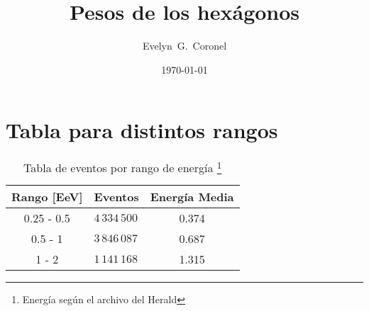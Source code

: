 



\title{Pesos de los hexágonos}
\author{Evelyn~G.~Coronel}


\date[]{\lowercase{\today}} %


\maketitle


\section*{Tabla para distintos rangos}
\begin{table}[H]
    \begin{small}
        \begin{center}
            \begin{tabular}[c]{c|l|c}
                \multicolumn{1}{c|}{\textbf{Rango [EeV]}} & 
                \multicolumn{1}{c|}{\textbf{Eventos}} 
                & \bf{Energía Media} \\
                \hline
                0.25 - 0.5 & $4\,334\,500$ & 0.374\\
                0.5 - 1 &   $3\,846\,087$ & 0.687\\
                1   - 2 & $1\,141\,168$ & 1.315 \\
            \end{tabular}
            \caption{Tabla de eventos por rango de energía \footnote{Energía según el archivo del Herald}}
            \label{tab:}
        \end{center}
    \end{small}
\end{table}


